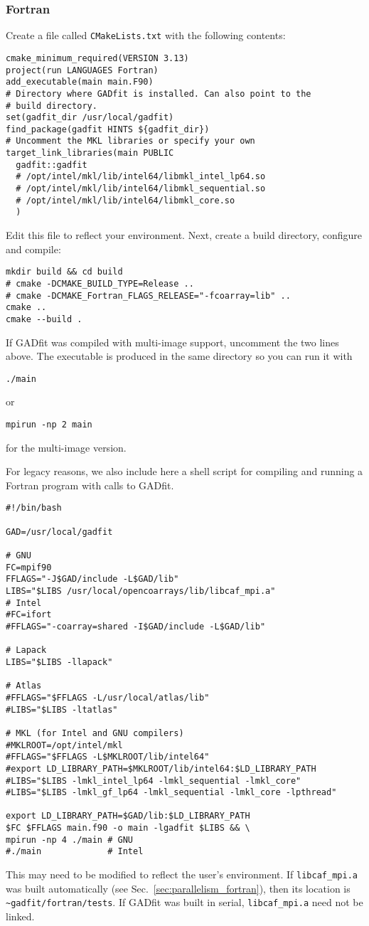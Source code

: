 \documentclass{article}
\begin{document}
\subsubsection{Fortran}

Create a file called \verb+CMakeLists.txt+ with the following contents:
\begin{verbatim}
cmake_minimum_required(VERSION 3.13)
project(run LANGUAGES Fortran)
add_executable(main main.F90)
# Directory where GADfit is installed. Can also point to the
# build directory.
set(gadfit_dir /usr/local/gadfit)
find_package(gadfit HINTS ${gadfit_dir})
# Uncomment the MKL libraries or specify your own
target_link_libraries(main PUBLIC
  gadfit::gadfit
  # /opt/intel/mkl/lib/intel64/libmkl_intel_lp64.so
  # /opt/intel/mkl/lib/intel64/libmkl_sequential.so
  # /opt/intel/mkl/lib/intel64/libmkl_core.so
  )
\end{verbatim}
Edit this file to reflect your environment. Next, create a build directory, configure and compile:
\begin{verbatim}
mkdir build && cd build
# cmake -DCMAKE_BUILD_TYPE=Release ..
# cmake -DCMAKE_Fortran_FLAGS_RELEASE="-fcoarray=lib" ..
cmake ..
cmake --build .
\end{verbatim}
If GADfit was compiled with multi-image support, uncomment the two lines above. The executable is produced in the same directory so you can run it with
\begin{verbatim}
./main
\end{verbatim}
or
\begin{verbatim}
mpirun -np 2 main
\end{verbatim}
for the multi-image version.

For legacy reasons, we also include here a shell script for compiling and running a Fortran program with calls to GADfit.
\begin{verbatim}
#!/bin/bash

GAD=/usr/local/gadfit

# GNU
FC=mpif90
FFLAGS="-J$GAD/include -L$GAD/lib"
LIBS="$LIBS /usr/local/opencoarrays/lib/libcaf_mpi.a"
# Intel
#FC=ifort
#FFLAGS="-coarray=shared -I$GAD/include -L$GAD/lib"

# Lapack
LIBS="$LIBS -llapack"

# Atlas
#FFLAGS="$FFLAGS -L/usr/local/atlas/lib"
#LIBS="$LIBS -ltatlas"

# MKL (for Intel and GNU compilers)
#MKLROOT=/opt/intel/mkl
#FFLAGS="$FFLAGS -L$MKLROOT/lib/intel64"
#export LD_LIBRARY_PATH=$MKLROOT/lib/intel64:$LD_LIBRARY_PATH
#LIBS="$LIBS -lmkl_intel_lp64 -lmkl_sequential -lmkl_core"
#LIBS="$LIBS -lmkl_gf_lp64 -lmkl_sequential -lmkl_core -lpthread"

export LD_LIBRARY_PATH=$GAD/lib:$LD_LIBRARY_PATH
$FC $FFLAGS main.f90 -o main -lgadfit $LIBS && \
mpirun -np 4 ./main # GNU
#./main             # Intel
\end{verbatim}
This may need to be modified to reflect the user's environment. If \verb+libcaf_mpi.a+ was built automatically (see Sec.~\ref{sec:parallelism_fortran}), then its location is \\ \verb+~gadfit/fortran/tests+. If GADfit was built in serial, \verb+libcaf_mpi.a+ need not be linked.
\end{document}
